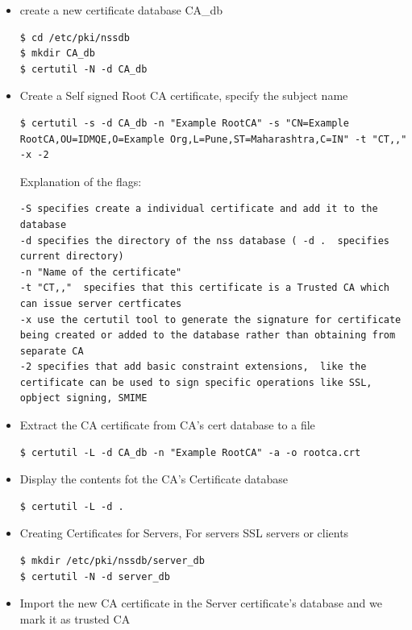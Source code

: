 \documentclass[a4paper]{article}
\begin{document}
\begin{enumerate}[label*=\arabic*.]
\begin{itemize}
            \item create a new certificate database CA\_db
                \begin{lstlisting}[style=BashInputStyle]
$ cd /etc/pki/nssdb
$ mkdir CA_db
$ certutil -N -d CA_db
                \end{lstlisting}
            \item Create a Self signed Root CA certificate, specify the subject name
                \begin{lstlisting}[style=BashInputStyle]
$ certutil -s -d CA_db -n "Example RootCA" -s "CN=Example RootCA,OU=IDMQE,O=Example Org,L=Pune,ST=Maharashtra,C=IN" -t "CT,," -x -2
                \end{lstlisting}
                Explanation of the flags:
                \begin{lstlisting}
-S specifies create a individual certificate and add it to the database
-d specifies the directory of the nss database ( -d .  specifies current directory)
-n "Name of the certificate"
-t "CT,,"  specifies that this certificate is a Trusted CA which can issue server certficates
-x use the certutil tool to generate the signature for certificate being created or added to the database rather than obtaining from separate CA
-2 specifies that add basic constraint extensions,  like the certificate can be used to sign specific operations like SSL, opbject signing, SMIME
                \end{lstlisting}
            \item Extract the CA certificate from CA's cert database to a file
                \begin{lstlisting}[style=BashInputStyle]
$ certutil -L -d CA_db -n "Example RootCA" -a -o rootca.crt
                \end{lstlisting}
            \item Display the contents fot the CA's Certificate database
                \begin{lstlisting}[style=BashInputStyle] 
$ certutil -L -d .
                \end{lstlisting}
            \item Creating Certificates for Servers, For servers SSL servers or clients
                \begin{lstlisting}[style=BashInputStyle]
$ mkdir /etc/pki/nssdb/server_db
$ certutil -N -d server_db
                \end{lstlisting}
            \item Import the new CA certificate in the Server certificate's database and we mark it as trusted CA

\end{itemize}
\end{enumerate}
\end{document}
